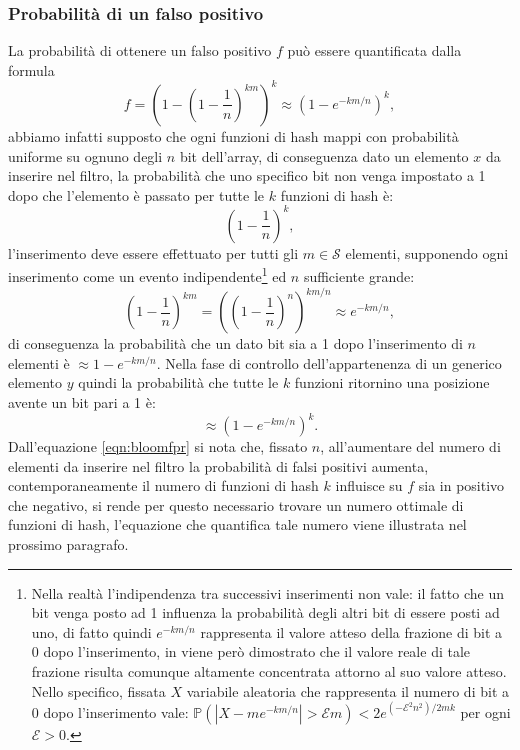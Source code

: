 \documentclass[../../main.tex]{subfiles}
\begin{document}
\subsubsection{Probabilità di un falso positivo}
La probabilità di ottenere un falso positivo $f$ può essere quantificata dalla formula
\begin{equation}
    f = \left(1 - \left(1 - \frac{1}{n}\right)^{km}\right)^k \approx \left(1 - e^{-km/n}\right)^k,
    \label{eqn:bloomfpr}
\end{equation}
abbiamo infatti supposto che ogni funzioni di hash mappi con probabilità uniforme su ognuno degli $n$ bit  dell'array, di conseguenza dato un elemento $x$ da inserire nel filtro, la probabilità che uno specifico bit non venga impostato a 1 dopo che l'elemento è passato per tutte le $k$ funzioni di hash è:
\[\left(1 - \frac{1}{n}\right)^k,\]
l'inserimento deve essere effettuato per tutti gli $m \in \mathcal{S}$ elementi, supponendo ogni inserimento come un evento indipendente\footnote{Nella realtà l'indipendenza tra successivi inserimenti non vale: il fatto che un bit venga posto ad 1 influenza la probabilità degli altri bit di essere posti ad uno, di fatto quindi $e^{-km/n}$ rappresenta il valore atteso della frazione di bit a 0 dopo l'inserimento, in \cite{10.1145/383962.384004} viene però dimostrato che il valore reale di tale frazione risulta comunque altamente concentrata attorno al suo valore atteso. Nello specifico, fissata $X$ variabile aleatoria che rappresenta il numero di bit a 0 dopo l'inserimento vale: $\mathbb{P}\left(|X - m e^{-km/n}| > \mathcal{E}m \right) < 2e^{(-\mathcal{E}^2 n^2)/2mk}$ per ogni $\mathcal{E} > 0$.} ed $n$ sufficiente grande:
\[\left(1 - \frac{1}{n}\right)^{km} = \left(\left(1 - \frac{1}{n}\right)^n\right)^{km/n} \approx e^{-km/n},\]
di conseguenza la probabilità che un dato bit sia a 1 dopo l'inserimento di $n$ elementi è $\approx 1 - e^{-km/n}$. Nella fase di controllo dell'appartenenza di un generico elemento $y$ quindi la probabilità che tutte le $k$ funzioni ritornino una posizione avente un bit pari a 1 è:
\[\approx \left(1 - e^{-km/n}\right)^k.\]
Dall'equazione \ref{eqn:bloomfpr} si nota che, fissato $n$, all'aumentare del numero di elementi da inserire nel filtro la probabilità di falsi positivi aumenta, contemporaneamente il numero di funzioni di hash $k$ influisce su $f$ sia in positivo che negativo, si rende per questo necessario trovare un numero ottimale di funzioni di hash, l'equazione che quantifica tale numero viene illustrata nel prossimo paragrafo.
\end{document}
